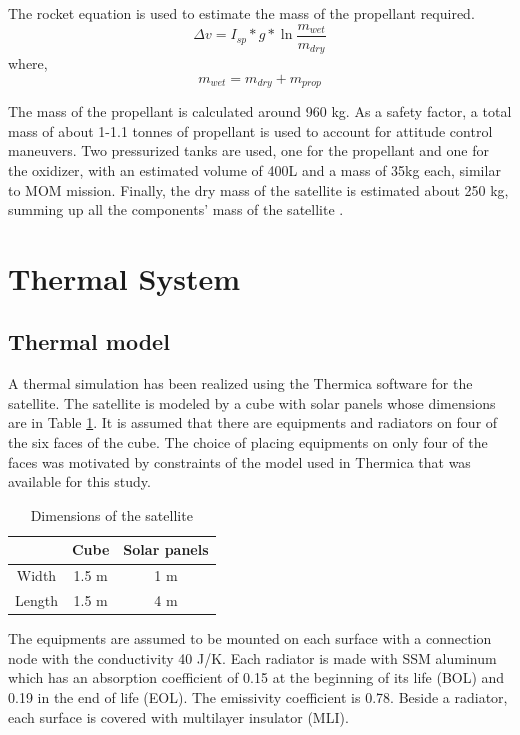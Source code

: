 \documentclass[a4paper, oneside, 11pt]{article}
\begin{document}
The rocket equation is used to estimate the mass of the propellant required.
\begin{equation}
\label{racket}
\Delta v = I_{sp}*g*\ln\frac{m_{wet}}{m_{dry}}
\end{equation}
where,
\begin{equation}
\label{propmass}
m_{wet} = m_{dry} + m_{prop}
\end{equation}

The mass of the propellant is calculated around 960 kg. As a safety factor, a total mass of about 1-1.1 tonnes of propellant is used to account for attitude control maneuvers. Two pressurized tanks are used, one for the propellant and one for the oxidizer, with an estimated volume of 400L and a mass of 35kg each, similar to MOM mission. Finally, the dry mass of the satellite is estimated about 250 kg, summing up all the components' mass of the satellite .


\section{Thermal System}

\subsection{ Thermal model }

A thermal simulation has been realized using the Thermica software for the satellite. The satellite is modeled by a cube with solar panels whose dimensions are in Table \ref{dimensions}. It is assumed that there are equipments and radiators on four of the six faces of the cube. The choice of placing equipments on only four of the faces was motivated by constraints of the model used in Thermica that was available for this study.

\begin{table}[H]
 \caption{Dimensions of the satellite}
 \label{dimensions}
\centering \begin{tabular}{| c | c |c |}
  \hline
 &  Cube & Solar panels  \\
   \hline
 Width & 1.5 m & 1 m     \\
     \hline
 Length & 1.5 m & 4 m    \\
     \hline
\end{tabular}
\end{table}

The equipments are assumed to be mounted on each surface with a connection node with the conductivity 40 J/K. Each radiator is made with SSM aluminum which has an absorption coefficient of 0.15  at the beginning of its life (BOL) and 0.19 in the end of life (EOL). The emissivity coefficient is 0.78. Beside a radiator, each surface is covered with multilayer insulator (MLI). 
\end{document}
